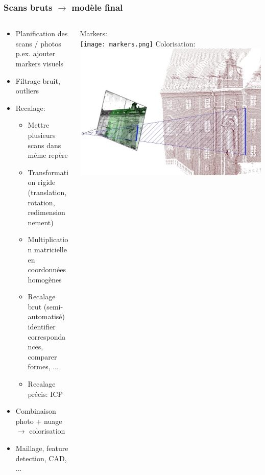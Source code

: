\documentclass{beamer}
\begin{document}
\begin{frame}
\frametitle{Scans bruts $\rightarrow$ modèle final}
	\begin{columns}
	\begin{column}[T]{.7\textwidth}
		\begin{itemize}
		\item Planification des scans / photos
			\\ p.ex. ajouter markers visuels
		\item Filtrage bruit, outliers
		\item Recalage:
			\begin{itemize}
				\item Mettre plusieurs scans dans même repère
				\item Transformation rigide \\
					(translation, rotation, redimensionnement)
				\item Multiplication matricielle en coordonnées homogènes
				\item Recalage brut (semi-automatisé)
					\\ identifier correspondances, comparer formes, ...
				\item Recalage précis: ICP
			\end{itemize}
		\item Combinaison photo + nuage $\rightarrow$ colorisation
		\item Maillage, feature detection, CAD, ...
		\end{itemize}
	\end{column}
	\begin{column}[T]{.3\textwidth}
		{\footnotesize Markers: \cite{Lerm2009}} \\
		\texttt{[image: markers.png]}
		\vspace{1cm}
		{\footnotesize Colorisation: \cite{Lich2011} } \\
		\includegraphics[width=\textwidth]{imagetocloud.png}
	\end{column}
	\end{columns}
\end{frame}
\end{document}
